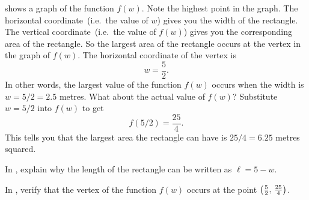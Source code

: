 \documentclass[a4paper,oneside,12pt]{article}
\begin{document}
\begin{solution}
 shows a graph of the function
$f(w)$.  Note the highest point in the graph.  The horizontal
coordinate~(i.e.~the value of $w$) gives you the width of the
rectangle.  The vertical coordinate~(i.e.~the value of $f(w)$) gives
you the corresponding area of the rectangle.  So the largest area of
the rectangle occurs at the vertex in the graph of $f(w)$.  The
horizontal coordinate of the vertex is
\[
w
=
\frac{5}{2}.
\]
In other words, the largest value of the function $f(w)$ occurs when
the width is $w = 5 / 2 = 2.5$ metres.  What about the actual value of
$f(w)$?  Substitute $w = 5 / 2$ into $f(w)$ to get
\[
f(5/2)
=
\frac{25}{4}.
\]
This tells you that the largest area the rectangle can have is
$25 / 4 = 6.25$ metres squared.
\end{solution}

\begin{exercise}
In , explain why the length of the
rectangle can be written as $\ell = 5 - w$.
\end{exercise}


\begin{exercise}
In , verify that the vertex of the
function $f(w)$ occurs at the point
$\left\lparen{\frac{5}{2}},\, {\frac{25}{4}}\right\rparen$.
\end{exercise}

\end{document}
